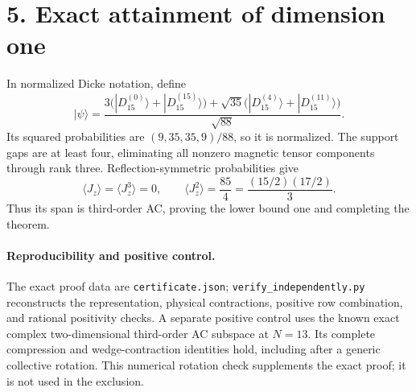 \documentclass[11pt]{article}
\begin{document}
\section*{5. Exact attainment of dimension one}
In normalized Dicke notation, define
\[
 |\psi\rangle=\frac{3\bigl(|D_{15}^{(0)}\rangle+|D_{15}^{(15)}\rangle\bigr)
 +\sqrt{35}\bigl(|D_{15}^{(4)}\rangle+|D_{15}^{(11)}\rangle\bigr)}{\sqrt{88}}.
\]
Its squared probabilities are $(9,35,35,9)/88$, so it is normalized.
The support gaps are at least four, eliminating all nonzero magnetic
tensor components through rank three. Reflection-symmetric probabilities give
\[
 \langle J_z\rangle=\langle J_z^3\rangle=0,
 \qquad \langle J_z^2\rangle=\frac{85}{4}
 =\frac{(15/2)(17/2)}3.
\]
Thus its span is third-order AC, proving the lower bound one and completing the theorem.

\paragraph{Reproducibility and positive control.}
The exact proof data are \texttt{certificate.json}; \texttt{verify\_independently.py} reconstructs the representation, physical contractions, positive row combination, and rational positivity checks. A separate positive control uses the known exact complex two-dimensional third-order AC subspace at $N=13$. Its complete compression and wedge-contraction identities hold, including after a generic collective rotation. This numerical rotation check supplements the exact proof; it is not used in the exclusion.
\end{document}
